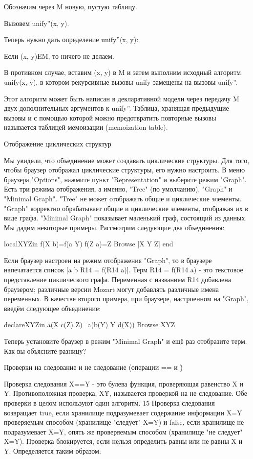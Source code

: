 Обозначим через M новую, пустую таблицу.

Вызовем unify''(x, y).

Теперь нужно дать определение unify''(x, y):

Если (x, y)EM, то ничего не делаем.

В противном случае, вставим (x, y) в M и затем выполним исходный алгоритм unify(x, y), в котором рекурсивные вызовы unify замещены на вызовы unify''.

Этот алгоритм может быть написан в декларативной модели через передачу M двух дополнительных аргументов к unify''. Таблица, хранящая предыдущие вызовы и с помощью которой можно предотвратить повторные вызовы называется таблицей мемоизации (memoization table).

Отображение циклических структур

Мы увидели, что объединение может создавать циклические структуры. Для того, чтобы браузер отображал циклические структуры, его нужно настроить. В меню браузера "Options", нажмите пункт "Representation" и выберите режим "Graph". Есть три режима отображения, а именно, "Tree" (по умолчанию), "Graph" и "Minimal Graph". "Tree" не может отображать общие и циклические элементы. "Graph" корректно обрабатывает общие и циклические элементы, отображая их в виде графа. "Minimal Graph" показывает маленький граф, состоящий из данных. Мы дадим некоторые примеры. Рассмотрим следующие два объединения:

localXYZin
f(X b)=f(a Y)
f(Z a)=Z
{Browse [X Y Z]}
end

Если браузер настроен на режим отображения "Graph", то в браузере напечатается список [a b R14 = f(R14 a)]. Терм R14 = f(R14 a) - это текстовое представление циклического графа. Переменная с названием R14 добавлена браузером; различные версии Mozart могут добавлять различные имена переменных. В качестве второго примера, при браузере, настроенном на "Graph", введём следующее объединение:

declareXYZin
a(X c(Z) Z)=a(b(Y) Y d(X))
{Browse XYZ}

Теперь установите браузер в режим "Minimal Graph" и ещё раз отобразите терм. Как вы объясните разницу?

Проверки на следование и не следование (операции == и \=)

Проверка следования X==Y - это булева функция, проверяющая равенство X и Y. Противоположная проверка, X\=Y, называется проверкой на не следование. Обе проверки в целом используют один алгоритм. 15 Проверка следования возвращает true, если хранилище подразумевает содержание информации X=Y проверяемым способом (хранилище "следует" X=Y) и false, если хранилище не подразумевает X=Y, опять же проверяемым способом (хранилище "не следует" X=Y). Проверка блокируется, если нельзя определить равны или не равны X и Y. Определяется таким образом:

